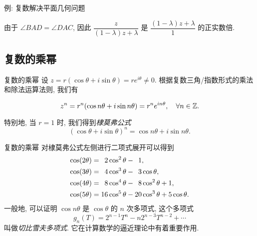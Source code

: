 \begin{frame}{例: 复数解决平面几何问题}
	\onslide<+->
	\begin{proofc}
		由于 $\angle BAD=\angle DAC$, 因此 $\dfrac{z}{(1-\lambda)z+\lambda}$ 是 $\dfrac{(1-\lambda)z+\lambda}{1}$ 的正实数倍.
		\onslide<+->{
			显然 $z\neq \ov z$. 又因为 $0<\lambda<1$, 故
			\[\frac{AB}{AC}=|z|=\frac{\lambda}{1-\lambda}
			=\frac{DB}{BC-DB}=\frac{DB}{DC}.\qedhere\]
		}
		\vspace{-\baselineskip}
	\end{proofc}
\end{frame}



\subsection{复数的乘幂}

\begin{frame}{复数的乘幂}
	\onslide<+->
	设 $z=r(\cos\theta+i\sin\theta)=re^{i\theta}\neq0$.
	\onslide<+->
	根据复数三角/指数形式的乘法和除法运算法则, 我们有
	\onslide<+->
	\begin{alertblock@}
		\[z^n=r^n(\cos{n\theta}+i\sin{n\theta})=r^ne^{in\theta},\quad\forall n\in{\mathbb{Z}}.\]
	\end{alertblock@}
	\onslide<+->
	特别地, 当 $r=1$ 时, 我们得到\emph{棣莫弗公式}
	\[(\cos\theta+i\sin\theta)^n=\cos{n\theta}+i\sin{n\theta}.\]
\end{frame}


\begin{frame}{复数的乘幂\noexer}
	\onslide<+->
	对棣莫弗公式左侧进行二项式展开可以得到
	\onslide<+->
	\begin{align*}
		\cos(2\theta)&=\hphantom{1}2\cos^2\theta-\hphantom{1}1,\\
		\cos(3\theta)&=\hphantom{1}4\cos^3\theta-\hphantom{1}3\cos\theta,\\
		\cos(4\theta)&=\hphantom{1}8\cos^4\theta-\hphantom{1}8\cos^2\theta+1,\\
		\cos(5\theta)&=16\cos^5\theta-20\cos^3\theta+5\cos\theta.
	\end{align*}
	\onslide<+->
	一般地, 可以证明 $\cos{n\theta}$ 是 $\cos\theta$ 的 $n$ 次多项式,
	\onslide<+->
	这个多项式
	\[g_n(T)=2^{n-1}T^n-n2^{n-3}T^{n-2}+\cdots\]
	叫做\emph{切比雪夫多项式}.
	\onslide<+->
	它在计算数学的逼近理论中有着重要作用.
\end{frame}


